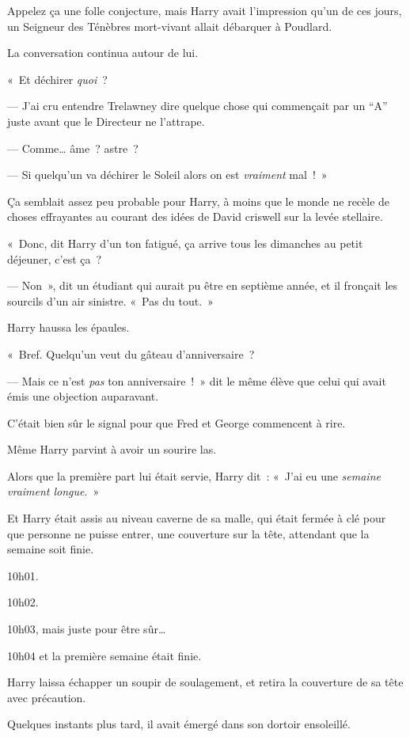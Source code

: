 Appelez ça une folle conjecture, mais Harry avait l'impression qu'un de ces jours, un Seigneur des Ténèbres mort-vivant allait débarquer à Poudlard.

La conversation continua autour de lui.

«~Et déchirer \emph{quoi}~?

--- J'ai cru entendre Trelawney dire quelque chose qui commençait par un “A” juste avant que le Directeur ne l'attrape.

--- Comme… âme~? astre~?

--- Si quelqu'un va déchirer le Soleil alors on est \emph{vraiment} mal~!~»

Ça semblait assez peu probable pour Harry, à moins que le monde ne recèle de choses effrayantes au courant des idées de David criswell sur la levée stellaire.

«~Donc, dit Harry d'un ton fatigué, ça arrive tous les dimanches au petit déjeuner, c'est ça~?

--- Non~», dit un étudiant qui aurait pu être en septième année, et il fronçait les sourcils d'un air sinistre. «~Pas du tout.~»

Harry haussa les épaules.

«~Bref. Quelqu'un veut du gâteau d'anniversaire~?

--- Mais ce n'est \emph{pas} ton anniversaire~!~» dit le même élève que celui qui avait émis une objection auparavant.

C'était bien sûr le signal pour que Fred et George commencent à rire.

Même Harry parvint à avoir un sourire las.

Alors que la première part lui était servie, Harry dit~: «~J'ai eu une \emph{semaine vraiment longue}.~»

\later

Et Harry était assis au niveau caverne de sa malle, qui était fermée à clé pour que personne ne puisse entrer, une couverture sur la tête, attendant que la semaine soit finie.

10h01.

10h02.

10h03, mais juste pour être sûr…

10h04 et la première semaine était finie.

Harry laissa échapper un soupir de soulagement, et retira la couverture de sa tête avec précaution.

Quelques instants plus tard, il avait émergé dans son dortoir ensoleillé.

